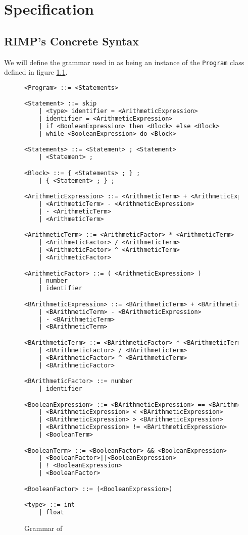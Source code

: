 \chapter{Specification}


\section{RIMP's Concrete Syntax}

We will define the grammar used in \rimp as being an instance of the \lstinline{Program} class defined in figure \ref{fig:grammar}.
\begin{figure}
    \centering
    \begin{lstlisting}[language=TeX,label={lst:grammar}, basicstyle=\small]
<Program> ::= <Statements>

<Statement> ::= skip
    | <type> identifier = <ArithmeticExpression>
    | identifier = <ArithmeticExpression>
    | if <BooleanExpression> then <Block> else <Block>
    | while <BooleanExpression> do <Block>

<Statements> ::= <Statement> ; <Statement>
    | <Statement> ;

<Block> ::= { <Statements> ; } ;
    | { <Statement> ; } ;

<ArithmeticExpression> ::= <ArithmeticTerm> + <ArithmeticExpression>
    | <ArithmeticTerm> - <ArithmeticExpression>
    | - <ArithmeticTerm>
    | <ArithmeticTerm>

<ArithmeticTerm> ::= <ArithmeticFactor> * <ArithmeticTerm>
    | <ArithmeticFactor> / <ArithmeticTerm>
    | <ArithmeticFactor> ^ <ArithmeticTerm>
    | <ArithmeticFactor>

<ArithmeticFactor> ::= ( <ArithmeticExpression> )
    | number
    | identifier

<BArithmeticExpression> ::= <BArithmeticTerm> + <BArithmeticExpression>
    | <BArithmeticTerm> - <BArithmeticExpression>
    | - <BArithmeticTerm>
    | <BArithmeticTerm>

<BArithmeticTerm> ::= <BArithmeticFactor> * <BArithmeticTerm>
    | <BArithmeticFactor> / <BArithmeticTerm>
    | <BArithmeticFactor> ^ <BArithmeticTerm>
    | <BArithmeticFactor>

<BArithmeticFactor> ::= number
    | identifier

<BooleanExpression> ::= <BArithmeticExpression> == <BArithmeticExpression>
    | <BArithmeticExpression> < <BArithmeticExpression>
    | <BArithmeticExpression> > <BArithmeticExpression>
    | <BArithmeticExpression> != <BArithmeticExpression>
    | <BooleanTerm>

<BooleanTerm> ::= <BooleanFactor> && <BooleanExpression>
    | <BooleanFactor>||<BooleanExpression>
    | ! <BooleanExpression>
    | <BooleanFactor>

<BooleanFactor> ::= (<BooleanExpression>)

<type> ::= int
    | float
\end{lstlisting}
    \caption{Grammar of \rimplang}
    \label{fig:grammar}
\end{figure}

